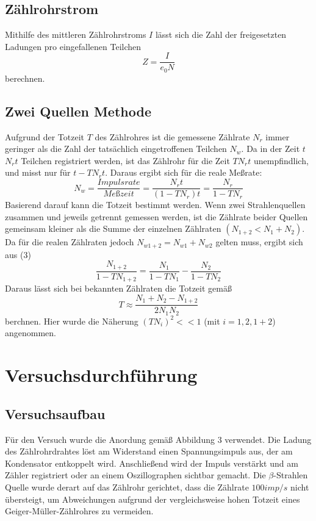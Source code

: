 \documentclass{scrartcl}
\begin{document}
\subsection{Zählrohrstrom}
Mithilfe des mittleren Zählrohrstroms $I$ lässt sich die Zahl der freigesetzten Ladungen pro eingefallenen Teilchen 
\begin{equation}
Z=\frac{I}{e_0N}
\end{equation}
berechnen. 
\subsection{Zwei Quellen Methode}
Aufgrund der Totzeit $T$ des Zählrohres ist die gemessene Zählrate $N_r$ immer geringer als die Zahl der tatsächlich eingetroffenen Teilchen $N_w$. Da in der Zeit $t$ $N_rt$ Teilchen registriert werden, ist das Zählrohr für die Zeit $TN_rt$ unempfindlich, und misst nur für $t-TN_rt$. Daraus ergibt sich für die reale Meßrate:
\begin{equation}
N_w=\frac{Impulsrate}{Meßzeit}=\frac{N_rt}{(1-TN_r)t}=\frac{N_r}{1-TN_r}
\end{equation}
Basierend darauf kann die Totzeit bestimmt werden. Wenn zwei Strahlenquellen zusammen und jeweils getrennt gemessen werden, ist die Zählrate beider Quellen gemeinsam kleiner als die Summe der einzelnen Zählraten $(N_{1+2}<N_1+N_2)$. Da für die realen Zählraten jedoch $N_{w1+2}=N_{w1}+N_{w2}$ gelten muss, ergibt sich aus (3)
\begin{equation}
\frac{N_{1+2}}{1-TN_{1+2}}=\frac{N_1}{1-TN_1}-\frac{N_2}{1-TN_2}
\end{equation}
Daraus lässt sich bei bekannten Zählraten die Totzeit gemäß
\begin{equation}
T\approx\frac{N_1+N_2-N_{1+2}}{2N_1N_2}
\end{equation}
berchnen. Hier wurde die Näherung $(TN_i)^2<<1$ (mit $i=1,2,1+2$) angenommen. 
\section{Versuchsdurchführung}
\subsection{Versuchsaufbau}
Für den Versuch wurde die Anordung gemäß Abbildung 3 verwendet. Die Ladung des Zählrohrdrahtes löst am Widerstand einen Spannungsimpuls aus, der am Kondensator entkoppelt wird. Anschließend wird der Impuls verstärkt und am Zähler registriert oder an einem Oszillographen sichtbar gemacht. Die $\beta$-Strahlen Quelle wurde derart auf das Zählrohr gerichtet, dass die Zählrate $100imp/s$ nicht übersteigt, um Abweichungen aufgrund der vergleichsweise hohen Totzeit eines Geiger-Müller-Zählrohres zu vermeiden.
\end{document}
